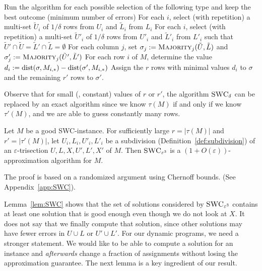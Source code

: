 \begin{algorithm}[H] 
    \caption{
        \label{alg:SWC}
        $\textsc{SWC}_\delta$}
    \SetAlgoNoLine
    \SetNlSkip{1em}
    Run the algorithm for each possible selection of the following type and keep the best outcome (minimum number of errors)
    For each $i$, select (with repetition) a multi-set $\tilde{U}_i$ of $1/\delta$ rows from $U_i$ and $\tilde{L}_i$ from $L_i$\;
    For each $i$, select (with repetition) a multi-set $\tilde{U}'_i$ of $1/\delta$ rows from $U'_i$ and $\tilde{L}'_i$ from $L'_i$ such that $\tilde{U}' \cap \tilde{U} = \tilde{L}' \cap \tilde{L} = \emptyset$\;
    For each column $j$, set $\sigma_j := \textsc{Majority}_j(\tilde{U}, \tilde{L})$ and $\sigma'_j := \textsc{Majority}_j(\tilde{U}', \tilde{L}')$\;
    For each row $i$ of $M$, determine the value $d_i := \mathrm{dist}(\sigma,M_{i,*}) - \mathrm{dist}(\sigma',M_{i,*})$\;
    Assign the $r$ rows with minimal values $d_i$ to $\sigma$ and the remaining $r'$ rows to $\sigma'$.
\end{algorithm}
\smallskip

Observe that for small (\ie, constant) values of $r$ or $r'$, the algorithm $\textsc{SWC}_\delta$ can be replaced by an exact algorithm since we know $\tau(M)$ if and only if we know $\tau'(M)$, and we are able to guess constantly many rows.

\begin{lemma}\label{lem:SWC}
    Let $M$ be a good SWC-instance.
    For sufficiently large $r = |\tau(M)|$ and $r' = |\tau'(M)|$, let $U_i, L_i, U'_i, L'_i$ be a subdivision (Definition~\ref{def:subdivision}) of an $\varepsilon$-trisection $U,L,X,U',L',X'$ of $M$.
    Then $\textsc{SWC}_{\varepsilon^3}$ is a $(1 + O(\varepsilon))$-approximation algorithm for $M$. 
\end{lemma}
The proof is based on a randomized argument using Chernoff bounds. (See Appendix~\ref{app:SWC}).

Lemma~\ref{lem:SWC} shows that the set of solutions considered by $\textsc{SWC}_{\varepsilon^3}$ contains at least one solution that is good enough even though we do not look at $X$. 
It does not say that we finally compute that solution, since other solutions may have fewer errors in $U\cup L$ or $U' \cup L'$.
For our dynamic programs, we need a stronger statement.
We would like to be able to compute a solution for an instance and \emph{afterwards} change a fraction of assignments without losing the approximation guarantee.
The next lemma is a key ingredient of our result.


